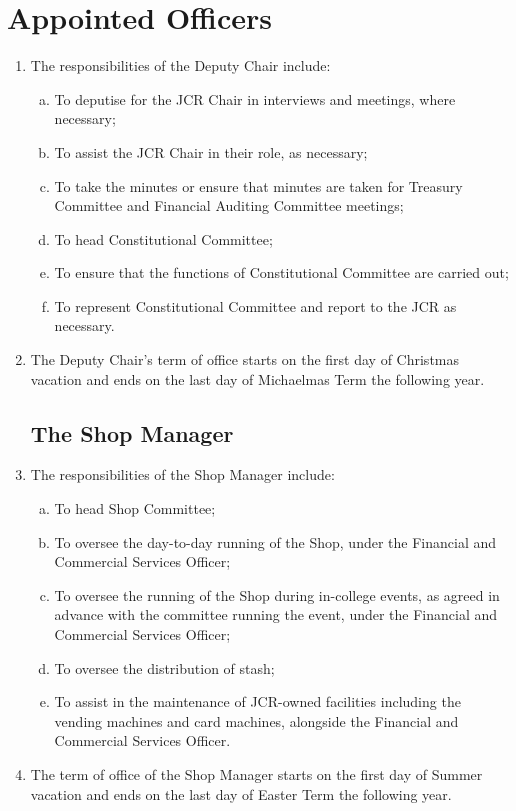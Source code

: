 \documentclass[12pt]{article}
\begin{document}
\section{Appointed Officers}
\begin{enumerate}
    \subsection{The Deputy Chair}
    \item The responsibilities of the Deputy Chair include:
    \begin{enumerate}[(a)]
        \item To deputise for the JCR Chair in interviews and meetings, where necessary;
        \item To assist the JCR Chair in their role, as necessary;
        \item To take the minutes or ensure that minutes are taken for Treasury Committee and Financial Auditing Committee meetings;
        \item To head Constitutional Committee;
        \item To ensure that the functions of Constitutional Committee are carried out;
        \item To represent Constitutional Committee and report to the JCR as necessary.
    \end{enumerate}
    \item The Deputy Chair's term of office starts on the first day of Christmas vacation and ends on the last day of Michaelmas Term the following year.
    \subsection{The Shop Manager}
    \item The responsibilities of the Shop Manager include:
    \begin{enumerate}[(a)]
        \item To head Shop Committee;
        \item To oversee the day-to-day running of the Shop, under the Financial and Commercial Services Officer;
        \item To oversee the running of the Shop during in-college events, as agreed in advance with the committee running the event, under the Financial and Commercial Services Officer;
        \item To oversee the distribution of stash;
        \item To assist in the maintenance of JCR-owned facilities including the vending machines and card machines, alongside the Financial and Commercial Services Officer.
    \end{enumerate}
    \item The term of office of the Shop Manager starts on the first day of Summer vacation and ends on the last day of Easter Term the following year.

\end{enumerate}
\end{document}
